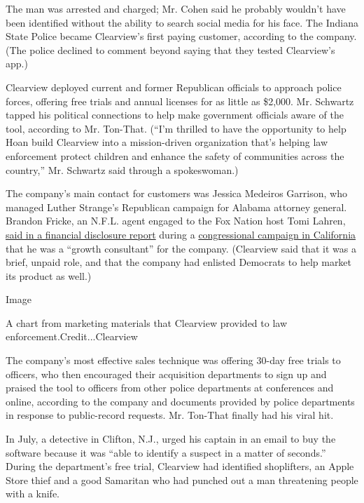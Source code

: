 The man was arrested and charged; Mr. Cohen said he probably wouldn't
have been identified without the ability to search social media for his
face. The Indiana State Police became Clearview's first paying customer,
according to the company. (The police declined to comment beyond saying
that they tested Clearview's app.)

Clearview deployed current and former Republican officials to approach
police forces, offering free trials and annual licenses for as little as
\$2,000. Mr. Schwartz tapped his political connections to help make
government officials aware of the tool, according to Mr. Ton-That.
(``I'm thrilled to have the opportunity to help Hoan build Clearview
into a mission-driven organization that's helping law enforcement
protect children and enhance the safety of communities across the
country,'' Mr. Schwartz said through a spokeswoman.)

The company's main contact for customers was Jessica Medeiros Garrison,
who managed Luther Strange's Republican campaign for Alabama attorney
general. Brandon Fricke, an N.F.L. agent engaged to the Fox Nation host
Tomi Lahren,
\href{http://clerk.house.gov/public_disc/financial-pdfs/2019/10029687.pdf}{said
in a financial disclosure report} during a
\href{https://splinternews.com/what-the-frick-e-is-this-1837985411}{congressional
campaign in California} that he was a ``growth consultant'' for the
company. (Clearview said that it was a brief, unpaid role, and that the
company had enlisted Democrats to help market its product as well.)

Image

A chart from marketing materials that Clearview provided to law
enforcement.Credit...Clearview

The company's most effective sales technique was offering 30-day free
trials to officers, who then encouraged their acquisition departments to
sign up and praised the tool to officers from other police departments
at conferences and online, according to the company and documents
provided by police departments in response to public-record requests.
Mr. Ton-That finally had his viral hit.

In July, a detective in Clifton, N.J., urged his captain in an email to
buy the software because it was ``able to identify a suspect in a matter
of seconds.'' During the department's free trial, Clearview had
identified shoplifters, an Apple Store thief and a good Samaritan who
had punched out a man threatening people with a knife.

